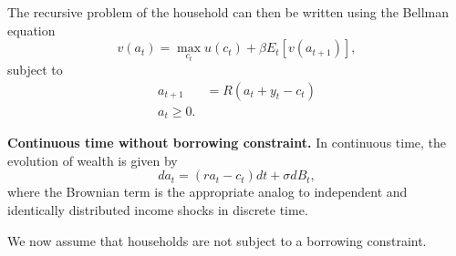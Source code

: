 \documentclass[11pt]{extarticle}
\theoremstyle{plain}
\theoremstyle{definition}
\begin{document}
The recursive problem of the household can then be written using the Bellman equation
\begin{equation}
	v(a_t) = \max_{c_t} u(c_t) + \beta E_t[v(a_{t+1})],
\end{equation}
subject to 
\begin{align*}
	a_{t+1} &= R(a_t + y_t - c_t) \\
	a_{t} \geq 0.
\end{align*}


\vspace{5mm}
\noindent
\textbf{Continuous time without borrowing constraint.} In continuous time, the evolution of wealth is given by 
\begin{equation}
	da_t = (ra_t - c_t) dt + \sigma dB_t,
\end{equation}
where the Brownian term is the appropriate analog to independent and identically distributed income shocks in discrete time. 

We now assume that households are not subject to a borrowing constraint.
\end{document}
